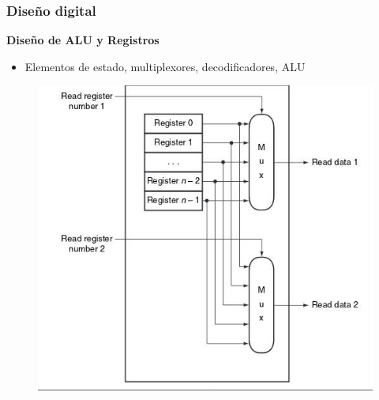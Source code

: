 \documentclass[aspectratio=169,compress]{beamer}
\begin{document}
\begin{footnotesize}
\begin{frame}[fragile]
\frametitle{Diseño digital}
\begin{center}\textbf{Diseño de ALU y Registros}\end{center}
\begin{itemize}
\item Elementos de estado, multiplexores, decodificadores, ALU
\end{itemize}
\begin{figure}
\includegraphics[scale=0.4]{images/leer-registro.jpg} 
\end{figure}
\end{frame}


\end{footnotesize}
\end{document}
